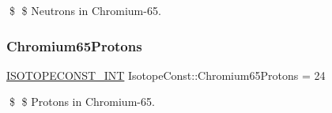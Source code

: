 \$ \$ Neutrons in Chromium-\/65. \mbox{\label{group___isotope_const-_chromium-_cr65_gadbc5140dd85912a84aa2f4d8e5a45f9f}} 
\subsubsection{\texorpdfstring{Chromium65\+Protons}{Chromium65Protons}}
{\footnotesize\ttfamily \mbox{\hyperlink{group___isotope_const-_macros_ga5f18360b3e99483a35c32d789e62621c}{I\+S\+O\+T\+O\+P\+E\+C\+O\+N\+S\+T\+\_\+\+I\+NT}} Isotope\+Const\+::\+Chromium65\+Protons = 24}

\$ \$ Protons in Chromium-\/65. 
